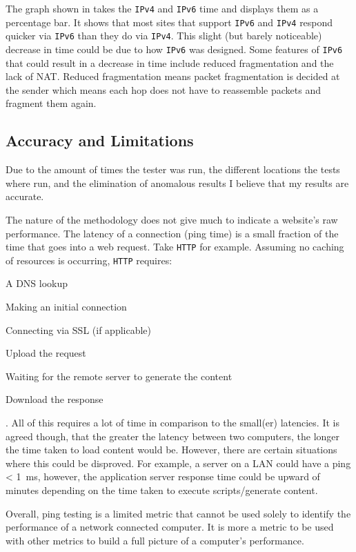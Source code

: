 \documentclass[a4paper]{article}
\def \IPF {\texttt{IPv4}}
\def \IPS {\texttt{IPv6}}
\begin{document}
The graph shown in  takes the {\IPF} and {\IPS} time and displays them as a percentage bar.
It shows that most sites that support {\IPS} and {\IPF} respond quicker via {\IPS} than they do via {\IPF}.
This slight (but barely noticeable) decrease in time could be due to how {\IPS} was designed.
Some features of {\IPS} that could result in a decrease in time include reduced fragmentation and the lack of NAT.
Reduced fragmentation means packet fragmentation is decided at the sender which means each hop does not have to reassemble packets and fragment them again.

\subsection*{Accuracy and Limitations}
Due to the amount of times the tester was run, the different locations the tests where run, and the elimination of anomalous results I believe that my results are accurate.

The nature of the methodology does not give much to indicate a website's raw performance.
The latency of a connection (ping time) is a small fraction of the time that goes into a web request.
Take \texttt{HTTP} for example. Assuming no caching of resources is occurring, \texttt{HTTP} requires:
\begin{enumerate*}
  \item A DNS lookup
  \item Making an initial connection
  \item Connecting via SSL (if applicable)
  \item Upload the request
  \item Waiting for the remote server to generate the content
  \item Download the response
\end{enumerate*}.
All of this requires a lot of time in comparison to the small(er) latencies.
It is agreed though, that the greater the latency between two computers, the longer the time taken to load content would be.
However, there are certain situations where this could be disproved.
For example, a server on a LAN could have a ping < \SI{1}{\milli\second}, however, the application server response time could be upward of minutes
depending on the time taken to execute scripts/generate content.

Overall, ping testing is a limited metric that cannot be used solely to identify the performance of a network connected computer.
It is more a metric to be used with other metrics to build a full picture of a computer's performance.

\newpage
\printbibliography
\end{document}
